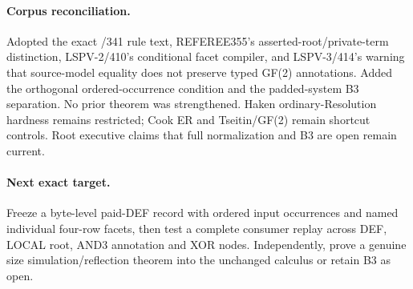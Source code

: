 \documentclass[11pt]{article}
\begin{document}
\paragraph{Corpus reconciliation.}
Adopted the exact /341 rule text, REFEREE355's asserted-root/private-term distinction, LSPV-2/410's conditional facet compiler, and LSPV-3/414's warning that source-model equality does not preserve typed GF(2) annotations.  Added the orthogonal ordered-occurrence condition and the padded-system B3 separation.  No prior theorem was strengthened.  Haken ordinary-Resolution hardness remains restricted; Cook ER and Tseitin/GF(2) remain shortcut controls.  Root executive claims that full normalization and B3 are open remain current.

\paragraph{Next exact target.}
Freeze a byte-level paid-DEF record with ordered input occurrences and named individual four-row facets, then test a complete consumer replay across DEF, LOCAL root, AND3 annotation and XOR nodes.  Independently, prove a genuine size simulation/reflection theorem into the unchanged calculus or retain B3 as open.
\end{document}

